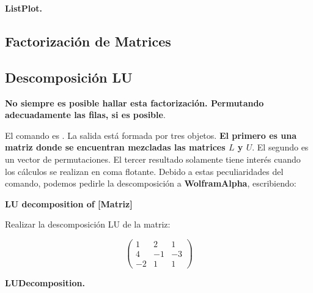 \documentclass[a4paper,10pt, draft]{article}
\newcommand{\com}[1]{\textbf{\color{blue}{#1}}}
\newenvironment{capitulo}{\begin{tcolorbox}[colback=red!5!white,colframe=red!75!black]}{\end{tcolorbox}\bigskip}
\newenvironment{ejer}{\begin{tcolorbox}[center title, title=Ejercicios,
fonttitle=\sffamily\bfseries,colback=blue!5,colframe=orange]}{\end{tcolorbox}}
\newenvironment{funciones}{\begin{tcolorbox}[center title, title=Nuevas funciones, fonttitle=\sffamily\bfseries, colback=green!5!white,colframe=red!75!black]}{\end{tcolorbox}\bigskip}
\begin{document}
\begin{funciones}

\textbf{ListPlot.}

\end{funciones}


\newpage


\begin{capitulo}

\section{Factorización de Matrices}

\end{capitulo}






\subsection{Descomposición LU}

 \textbf{No siempre es posible hallar esta factorización. Permutando adecuadamente las filas, si es posible}. 

El comando es \com{LUDecomposition[M]}.  La salida está formada por tres objetos. \textbf{El primero es una matriz donde se encuentran mezcladas las matrices $L$ y $U$}. El segundo es un vector de permutaciones. El tercer resultado solamente tiene interés cuando los cálculos se realizan en coma flotante. Debido a estas peculiaridades del comando, podemos pedirle la descomposición a \textbf{WolframAlpha}, escribiendo:
 \begin{center}
 
 \textbf{LU decomposition of [Matriz]}
 
 \end{center}
 

\enlargethispage{2cm}



\begin{ejer}

Realizar la descomposición LU de la matriz:

$$
\begin{pmatrix}
1 & 2 &1\\
4& -1&-3\\
-2&1&1
\end{pmatrix}
$$

\end{ejer} 



 \begin{funciones}
 
 \textbf{LUDecomposition.}
 
 \end{funciones}
 
\end{document}
